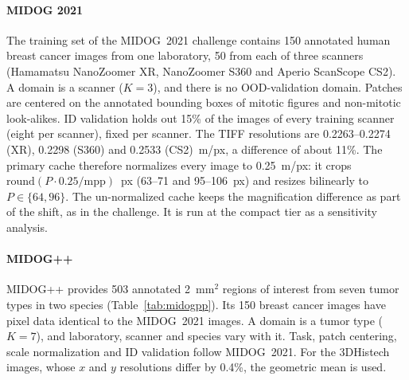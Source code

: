 \paragraph{MIDOG 2021} The training set of the MIDOG~2021 challenge
\citep{aubreville2023midog} contains 150 annotated human breast cancer images
from one laboratory, 50 from each of three scanners (Hamamatsu NanoZoomer XR,
NanoZoomer S360 and Aperio ScanScope CS2). A domain is a scanner ($K=3$), and
there is no OOD-validation domain. Patches are centered on the annotated
bounding boxes of mitotic figures and non-mitotic look-alikes. ID validation
holds out 15\% of the images of every training scanner (eight per scanner),
fixed per scanner. The TIFF resolutions are 0.2263--0.2274 (XR), 0.2298 (S360)
and 0.2533 (CS2)~\textmu m/px, a difference of about 11\%. The primary cache
therefore normalizes every image to 0.25~\textmu m/px: it crops
$\mathrm{round}(P\cdot0.25/\mathrm{mpp})$~px (63--71 and 95--106~px) and
resizes bilinearly to $P\in\{64,96\}$. The un-normalized cache keeps the
magnification difference as part of the shift, as in the challenge. It is run
at the compact tier as a sensitivity analysis.

\paragraph{MIDOG++} MIDOG++ \citep{aubreville2023midogpp} provides 503
annotated 2~mm$^2$ regions of interest from seven tumor types in two species
(Table~\ref{tab:midogpp}). Its 150 breast cancer images have pixel data
identical to the MIDOG~2021 images. A domain is a tumor type ($K=7$), and
laboratory, scanner and species vary with it. Task, patch centering, scale
normalization and ID validation follow MIDOG~2021. For the 3DHistech images,
whose $x$ and $y$ resolutions differ by 0.4\%, the geometric mean is used.

